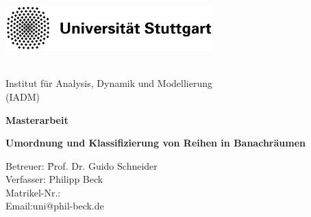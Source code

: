 \documentclass[12pt,twoside,a4paper]{scrbook}
\author{Philipp Beck}
\numberwithin{equation}{chapter}
\theoremstyle{satz}
\theoremstyle{def}
\newcommand{\blankpage}{
	\newpage
	\thispagestyle{empty}
	\mbox{}
	\newpage
}
\begin{document}
\thispagestyle{empty}
\begin{center}
	
	
	\hspace{-1.0cm}
	\includegraphics[width=0.6\textwidth]{uni_logo.png}
	\vspace{-0.6 cm}
	
	\hspace{2,2cm}
	\\[1cm]
	{\Large Institut für Analysis, Dynamik und Modellierung\\(IADM)}
	
	
	\vspace*{3cm}
	
	\Large{\textbf{Masterarbeit}\\
		
		\vspace{1cm}
		
		\textbf{\Large{Umordnung und Klassifizierung von Reihen in Banachräumen}}
		
		\vspace*{1mm}
		
		
		\vspace{1.5cm}
		
		
		\parbox{120mm}{
			\begin{large}
				\begin{tabbing}
					Betreuer: \hspace{0.7cm} \= Prof. Dr. Guido Schneider\\[4mm]
					Verfasser:\> Philipp Beck\\ %
					Matrikel-Nr.:\\
					Email:\>uni@phil-beck.de\\
				\end{tabbing}
			\end{large}
		}}
	\end{center}
\blankpage
{}	
\cleardoublepage
\setcounter{page}{1}
\end{document}
